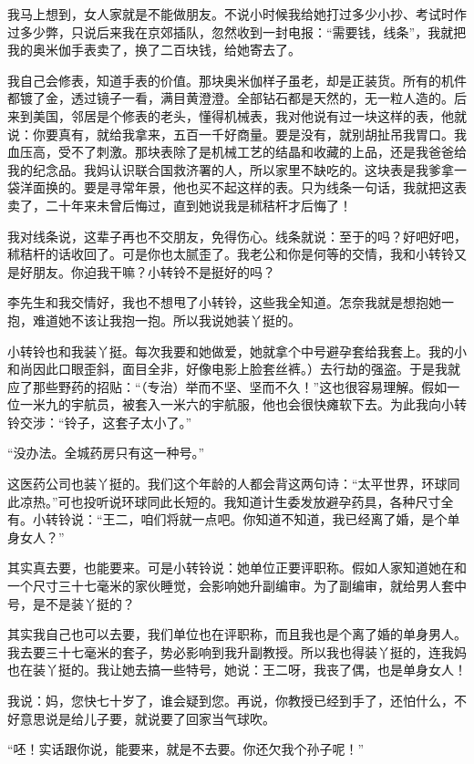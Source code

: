 我马上想到，女人家就是不能做朋友。不说小时候我给她打过多少小抄、考试时作过多少弊，只说后来我在京郊插队，忽然收到一封电报：“需要钱，线条”，我就把我的奥米伽手表卖了，换了二百块钱，给她寄去了。 

我自己会修表，知道手表的价值。那块奥米伽样子虽老，却是正装货。所有的机件都镀了金，透过镜子一看，满目黄澄澄。全部钻石都是天然的，无一粒人造的。后来到美国，邻居是个修表的老头，懂得机械表，我对他说有过一块这样的表，他就说：你要真有，就给我拿来，五百一千好商量。要是没有，就别胡扯吊我胃口。我血压高，受不了刺激。那块表除了是机械工艺的结晶和收藏的上品，还是我爸爸给我的纪念品。我妈认识联合国救济署的人，所以家里不缺吃的。这块表是我爹拿一袋洋面换的。要是寻常年景，他也买不起这样的表。只为线条一句话，我就把这表卖了，二十年来未曾后悔过，直到她说我是秫秸杆才后悔了！ 

我对线条说，这辈子再也不交朋友，免得伤心。线条就说：至于的吗？好吧好吧，秫秸杆的话收回了。可是你也太腻歪了。我老公和你是何等的交情，我和小转铃又是好朋友。你迫我干嘛？小转铃不是挺好的吗？ 

李先生和我交情好，我也不想甩了小转铃，这些我全知道。怎奈我就是想抱她一抱，难道她不该让我抱一抱。所以我说她装丫挺的。 

小转铃也和我装丫挺。每次我要和她做爱，她就拿个中号避孕套给我套上。我的小和尚因此口眼歪斜，面目全非，好像电影上脸套丝裤。）去行劫的强盗。于是我就应了那些野药的招贴：“（专治）举而不坚、坚而不久！”这也很容易理解。假如一位一米九的宇航员，被套入一米六的宇航服，他也会很快瘫软下去。为此我向小转铃交涉：“铃子，这套子太小了。” 

“没办法。全城药房只有这一种号。” 

这医药公司也装丫挺的。我们这个年龄的人都会背这两句诗：“太平世界，环球同此凉热。”可也投听说环球同此长短的。我知道计生委发放避孕药具，各种尺寸全有。小转铃说：“王二，咱们将就一点吧。你知道不知道，我已经离了婚，是个单身女人？” 

其实真去要，也能要来。可是小转铃说：她单位正要评职称。假如人家知道她在和一个尺寸三十七毫米的家伙睡觉，会影响她升副编审。为了副编审，就给男人套中号，是不是装丫挺的？ 

其实我自己也可以去要，我们单位也在评职称，而且我也是个离了婚的单身男人。我去要三十七毫米的套子，势必影响到我升副教授。所以我也得装丫挺的，连我妈也在装丫挺的。我让她去搞一些特号，她说：王二呀，我丧了偶，也是单身女人！ 

我说：妈，您快七十岁了，谁会疑到您。再说，你教授已经到手了，还怕什么，不好意思说是给儿子要，就说要了回家当气球吹。 

“呸！实话跟你说，能要来，就是不去要。你还欠我个孙子呢！” 

